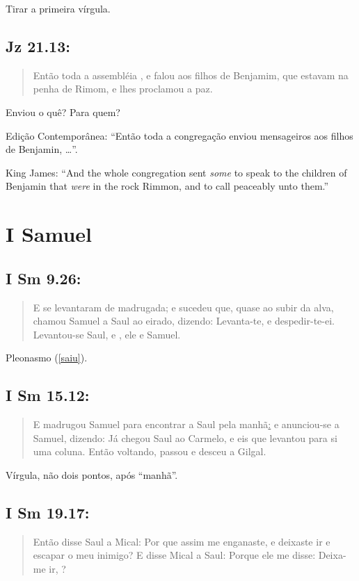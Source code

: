 Tirar a primeira vírgula.

\subsection{Jz 21.13:}\label{enviar}
\begin{quote}
    \small
    Então toda a assembléia , e falou aos filhos de Benjamim, que estavam na penha de Rimom, e lhes proclamou a paz.
\end{quote}

Enviou o quê? Para quem?

Edição Contemporânea: ``Então toda a congregação enviou mensageiros aos filhos de Benjamin, \ldots''.

King James: ``And the whole congregation sent \emph{some} to speak to the
children of Benjamin that \emph{were} in the rock Rimmon, and to call
peaceably unto them.''

\section{I Samuel}
\subsection{I Sm 9.26:}
\begin{quote}
    \small
    E se levantaram de madrugada; e sucedeu que, quase ao subir da alva, chamou Samuel a Saul ao eirado, dizendo: Levanta-te, e despedir-te-ei. Levantou-se Saul, e , ele e Samuel.
\end{quote}

Pleonasmo (\ref{saiu}).

\subsection{I Sm 15.12:}
\begin{quote}
    \small
    E madrugou Samuel para encontrar a Saul pela manhã\uline{:} e anunciou-se a Samuel, dizendo: Já chegou Saul ao Carmelo, e eis que levantou para si uma coluna. Então voltando, passou e desceu a Gilgal.
\end{quote}

Vírgula, não dois pontos, após ``manhã''.

\subsection{I Sm 19.17:}
\begin{quote}
    \small
Então disse Saul a Mical: Por que assim me enganaste, e deixaste ir e escapar o meu inimigo? E disse Mical a Saul: Porque ele me disse: Deixa-me ir, ?
\end{quote}

